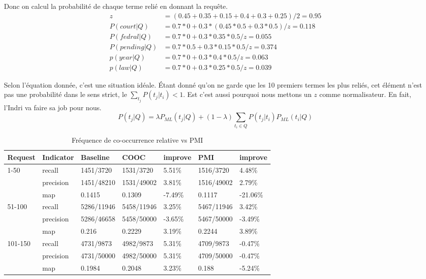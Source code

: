 \documentclass[a4paper]{article}
\begin{document}
Donc on calcul la probabilité de chaque terme relié en donnant la requête.
\begin{align*}
z&=(0.45+0.35+0.15+0.4+0.3+0.25)/2 = 0.95 \\
P(court|Q) &= 0.7*0 + 0.3* (0.45*0.5 + 0.3*0.5)/z = 0.118 \\
P(fedral|Q) &= 0.7*0 + 0.3*0.35*0.5/z = 0.055 \\
P(pending|Q) &= 0.7*0.5 + 0.3* 0.15*0.5/z = 0.374 \\
p(year|Q) &= 0.7*0 + 0.3*0.4*0.5/z = 0.063 \\
p(law|Q) &= 0.7*0 + 0.3*0.25*0.5/z = 0.039
\end{align*}


Selon l'équation donnée, c'est une situation idéale. Étant donné qu’on ne garde que les 10 premiers termes les plus reliés, cet élément n’est pas une probabilité dans le sens strict, le $\sum_{t_j}{P(t_j|t_i)}<1$. Est c'est aussi pourquoi nous mettons un $z$ comme normalisateur. En fait, l'Indri va faire sa job pour nous. 
\[P( t_{j}|Q) =\lambda P_{ML}( t_{j} |Q) +( 1-\lambda )\sum _{t_{i} \in Q} P( t_{j} | t_{i}) P_{ML}( t_{i} | Q)\]

\begin{table}[htp]
\centering
\begin{tabular}{|l|l|l|l|l|l|l|}
\hline
Request & Indicator & Baseline       & COOC & improve & PMI        & improve  \\ \hline
1-50    & recall    & 1451/3720      & 1531/3720        & 5.51\%  & 1516/3720  & 4.48\%   \\ \hline
        & precision & 1451/48210     & 1531/49002       & 3.81\%  & 1516/49002 & 2.79\%   \\ \hline
        & map       & 0.1415         & 0.1309           & -7.49\% & 0.1117     & -21.06\% \\ \hline
51-100  & recall    & 5286/11946     & 5458/11946       & 3.25\%  & 5467/11946 & 3.42\%   \\ \hline
        & precision & 5286/46658     & 5458/50000       & -3.65\% & 5467/50000 & -3.49\%  \\ \hline
        & map       & 0.216          & 0.2229           & 3.19\%  & 0.2244     & 3.89\%   \\ \hline
101-150 & recall    & 4731/9873      & 4982/9873        & 5.31\%  & 4709/9873  & -0.47\%  \\ \hline
        & precision & 4731/50000     & 4982/50000       & 5.31\%  & 4709/50000 & -0.47\%  \\ \hline
        & map       & 0.1984         & 0.2048           & 3.23\%  & 0.188      & -5.24\%  \\ \hline
\end{tabular}
\caption{Fréquence de co-occurrence relative vs PMI}
\label{tab:esp_glo}
\end{table}


\end{document}

